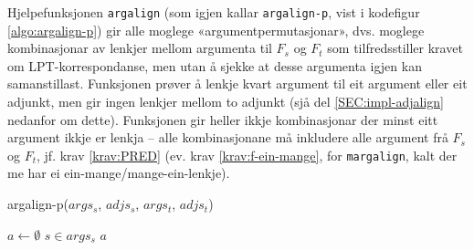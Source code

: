 \documentclass[12pt,a4paper,oneside,draft]{report}
\begin{document}
 Hjelpefunksjonen \texttt{argalign} (som igjen kallar \texttt{argalign-p}, vist i
 kodefigur \ref{algo:argalign-p}) gir alle moglege
 «argumentpermutasjonar», dvs. moglege kombinasjonar av lenkjer mellom
 argumenta til $F_s$ og $F_t$ som tilfredsstiller kravet om
 LPT\hyp{}korrespondanse, men utan å sjekke at desse argumenta igjen kan
 samanstillast. Funksjonen prøver å lenkje kvart argument til eit
 argument eller eit adjunkt, men gir ingen lenkjer mellom to adjunkt
 (sjå del \ref{SEC:impl-adjalign} nedanfor om dette). Funksjonen gir
 heller ikkje kombinasjonar der minst eitt argument ikkje er lenkja --
 alle kombinasjonane må inkludere alle argument frå $F_s$ og $F_t$,
 jf. krav \ref{krav:PRED} (ev. krav \ref{krav:f-ein-mange}, for
 \texttt{margalign}, kalt der me har ei ein-mange/mange-ein-lenkje). 
  \begin{algorithm}[htbp]
    \caption{argalign-p($args_s$, $adjs_s$, $args_t$, $adjs_t$)}
    \label{algo:argalign-p}
    
    \BlankLine
    
    $a \gets \emptyset$\;
     {
      $s \in args_s$\;
       {
      }
       {
      }
      \Return $a$\;
    }
     {
    }
  \end{algorithm}
\end{document}

